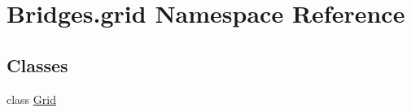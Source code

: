 \hypertarget{namespace_bridges_1_1grid}{}\section{Bridges.\+grid Namespace Reference}
\label{namespace_bridges_1_1grid}
\subsection*{Classes}
\begin{DoxyCompactItemize}
\item 
class \hyperlink{class_bridges_1_1grid_1_1_grid}{Grid}
\end{DoxyCompactItemize}
